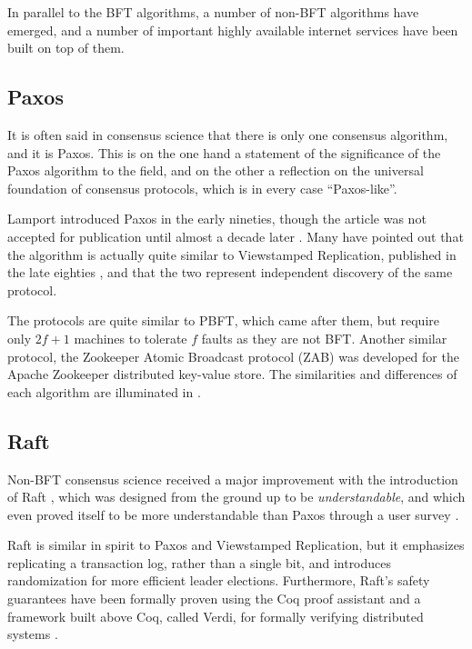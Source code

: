 In parallel to the BFT algorithms, a number of non-BFT algorithms have emerged, and a 
number of important highly available internet services have been built on top of them.

\subsection{Paxos}

It is often said in consensus science that there is only one consensus algorithm, and it is Paxos.
This is on the one hand a statement of the significance of the Paxos algorithm to the field,
and on the other a reflection on the universal foundation of consensus protocols,
which is in every case ``Paxos-like''.

Lamport introduced Paxos in the early nineties, though the article was not accepted for publication until 
almost a decade later \cite{paxos}.
Many have pointed out that the algorithm is actually quite similar to Viewstamped Replication,
published in the late eighties \cite{oki1988viewstamped},
and that the two represent independent discovery of the same protocol.

The protocols are quite similar to PBFT, which came after them, 
but require only $2f+1$ machines to tolerate $f$ faults as they are not BFT.
Another similar protocol, the Zookeeper Atomic Broadcast protocol (ZAB) \cite{junqueira2011zab}
was developed for the Apache Zookeeper distributed key-value store.
The similarities and differences of each algorithm are illuminated in \cite{van2015vive}.

\subsection{Raft} 

Non-BFT consensus science received a major improvement with the introduction of Raft \cite{raft},
which was designed from the ground up to be \emph{understandable}, 
and which even proved itself to be more understandable than Paxos through a user survey \cite{raft_thesis}.

Raft is similar in spirit to Paxos and Viewstamped Replication, but it emphasizes replicating a transaction log, 
rather than a single bit, and introduces randomization for more efficient leader elections.
Furthermore, Raft's safety guarantees have been formally proven using the Coq proof assistant \cite{woos2016planning}
and a framework built above Coq, called Verdi, for formally verifying distributed systems \cite{wilcox2015verdi}.

